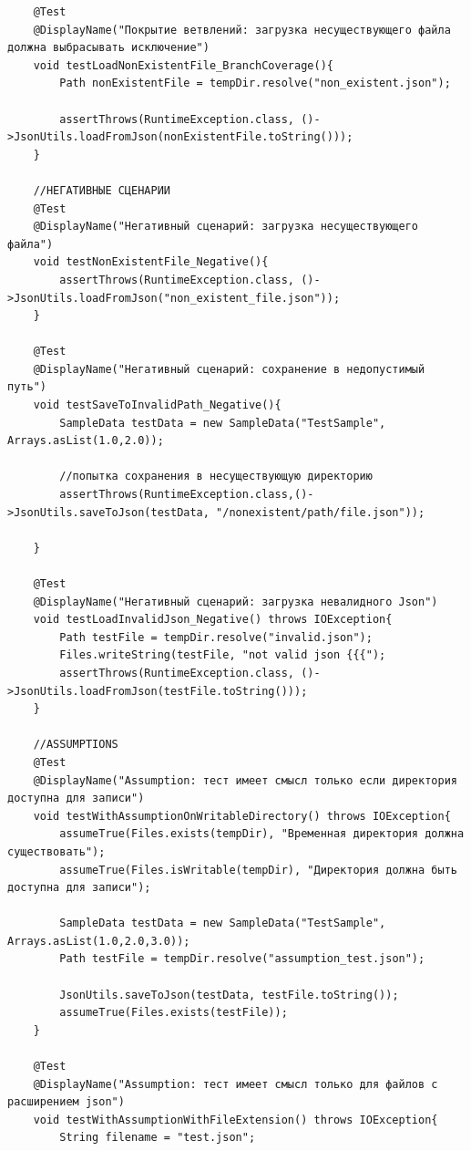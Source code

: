 \begin{verbatim}
    @Test
    @DisplayName("Покрытие ветвлений: загрузка несуществующего файла должна выбрасывать исключение")
    void testLoadNonExistentFile_BranchCoverage(){
        Path nonExistentFile = tempDir.resolve("non_existent.json");

        assertThrows(RuntimeException.class, ()->JsonUtils.loadFromJson(nonExistentFile.toString()));
    }

    //НЕГАТИВНЫЕ СЦЕНАРИИ
    @Test
    @DisplayName("Негативный сценарий: загрузка несуществующего файла")
    void testNonExistentFile_Negative(){
        assertThrows(RuntimeException.class, ()->JsonUtils.loadFromJson("non_existent_file.json"));
    }

    @Test
    @DisplayName("Негативный сценарий: сохранение в недопустимый путь")
    void testSaveToInvalidPath_Negative(){
        SampleData testData = new SampleData("TestSample", Arrays.asList(1.0,2.0));

        //попытка сохранения в несуществующую директорию
        assertThrows(RuntimeException.class,()->JsonUtils.saveToJson(testData, "/nonexistent/path/file.json"));

    }

    @Test
    @DisplayName("Негативный сценарий: загрузка невалидного Json")
    void testLoadInvalidJson_Negative() throws IOException{
        Path testFile = tempDir.resolve("invalid.json");
        Files.writeString(testFile, "not valid json {{{");
        assertThrows(RuntimeException.class, ()->JsonUtils.loadFromJson(testFile.toString()));
    }

    //ASSUMPTIONS
    @Test
    @DisplayName("Assumption: тест имеет смысл только если директория доступна для записи")
    void testWithAssumptionOnWritableDirectory() throws IOException{
        assumeTrue(Files.exists(tempDir), "Временная директория должна существовать");
        assumeTrue(Files.isWritable(tempDir), "Директория должна быть доступна для записи");

        SampleData testData = new SampleData("TestSample", Arrays.asList(1.0,2.0,3.0));
        Path testFile = tempDir.resolve("assumption_test.json");

        JsonUtils.saveToJson(testData, testFile.toString());
        assumeTrue(Files.exists(testFile));
    }

    @Test
    @DisplayName("Assumption: тест имеет смысл только для файлов с расширением json")
    void testWithAssumptionWithFileExtension() throws IOException{
        String filename = "test.json";


\end{verbatim}
